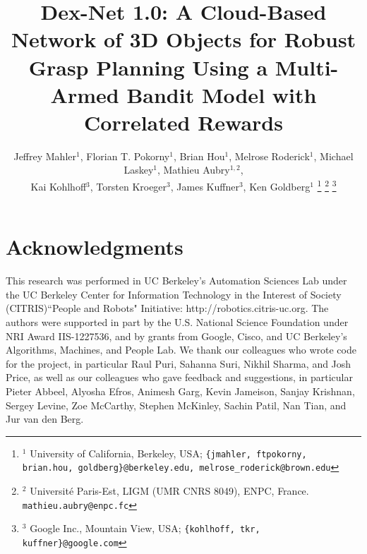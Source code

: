 \documentclass[letterpaper, 10 pt, conference]{ieeeconf}  %
\begin{document}
\title{\LARGE \bf Dex-Net 1.0: A Cloud-Based Network of 3D Objects for Robust Grasp Planning Using a Multi-Armed Bandit Model with Correlated Rewards
	\vspace{-2ex}
	}
\author{Jeffrey Mahler$^1$, Florian T. Pokorny$^1$, Brian Hou$^1$, Melrose Roderick$^1$, Michael Laskey$^1$, Mathieu Aubry$^{1,2}$, \\
Kai Kohlhoff$^3$, Torsten Kroeger$^3$, James Kuffner$^3$, Ken Goldberg$^{1}$
\thanks{{\small $^1$ University of California, Berkeley, USA; {\tt\small \{jmahler, ftpokorny, brian.hou, goldberg\}@berkeley.edu, melrose\_roderick@brown.edu}}}%
\thanks{{\small $^2$ Universit\'e Paris-Est, LIGM (UMR CNRS 8049), ENPC, France. {\tt\small mathieu.aubry@enpc.fc}}}%
\thanks{{\small $^3$ Google Inc., Mountain View, USA; {\tt\small \{kohlhoff, tkr, kuffner\}@google.com}} }
}
\maketitle


%


%


%




%

\section{Acknowledgments}
{\small
This research was performed in UC Berkeley's Automation Sciences Lab under the UC Berkeley Center for Information Technology in the Interest of Society (CITRIS)``People and Robots" Initiative: http://robotics.citris-uc.org.
The authors were supported in part by the U.S. National Science Foundation under NRI Award IIS-1227536, and by grants from Google, Cisco, and UC Berkeley's Algorithms, Machines, and People Lab.
We thank our colleagues who wrote code for the project, in particular Raul Puri, Sahanna Suri, Nikhil Sharma, and Josh Price, as well as our colleagues who gave feedback and suggestions, in particular Pieter Abbeel, Alyosha Efros, Animesh Garg, Kevin Jameison, Sanjay Krishnan, Sergey Levine, Zoe McCarthy, Stephen McKinley, Sachin Patil, Nan Tian, and Jur van den Berg.
}



\end{document}
